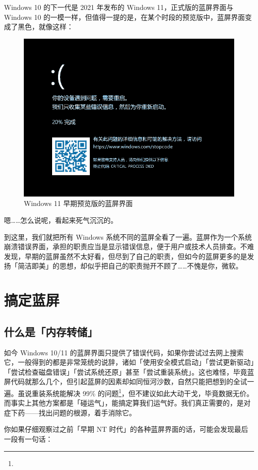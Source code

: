 Windows 10 的下一代是 2021 年发布的 Windows 11，正式版的蓝屏界面与 Windows 10 的一模一样，但值得一提的是，在某个时段的预览版中，蓝屏界面变成了黑色，就像这样：

\begin{figure}[htb!]
  \centering
  \includegraphics[width=.65\textwidth]{assets/advanced/Win-11-Pre-BSoD.png}
  \caption{Windows 11 早期预览版的蓝屏界面}
  \label{fig:Win-11-Pre-BSoD}
\end{figure}

嗯……怎么说呢，看起来死气沉沉的。

到这里，我们就把所有 Windows 系统不同的蓝屏全看了一遍。蓝屏作为一个系统崩溃错误界面，承担的职责应当是显示错误信息，便于用户或技术人员排查。不难发现，早期的蓝屏虽然不太好看，但尽到了自己的职责，但如今的蓝屏更多的是发扬「简洁即美」的思想，却似乎把自己的职责抛开不顾了……不愧是你，微软。

\section{搞定蓝屏}

\subsection{什么是「内存转储」}

如今 Windows 10/11 的蓝屏界面只提供了错误代码，如果你尝试过去网上搜索它，一般得到的都是非常笼统的说辞，诸如「使用安全模式启动」「尝试更新驱动」「尝试检查磁盘错误」「尝试系统还原」甚至「尝试重装系统」。这也难怪，毕竟蓝屏代码就那么几个，但引起蓝屏的因素却如同恒河沙数，自然只能把想到的全试一遍。虽说重装系统能解决 99\% 的问题\footnote{}，但不建议如此大动干戈，毕竟数据无价。而事实上其他方案都是「碰运气」，能搞定算我们运气好。我们真正需要的，是对症下药——找出问题的根源，着手消除它。

你如果仔细观察过之前「早期 NT 时代」的各种蓝屏界面的话，可能会发现最后一段有一句话：


